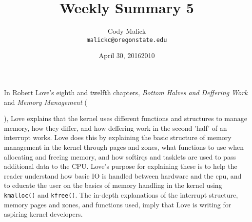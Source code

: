\documentclass[10pt,letterpaper]{article}
\begin{document}
  \title{Weekly Summary 5}
  \author{Cody Malick\\
  \texttt{malickc@oregonstate.edu}}
  \date{April 30, 2016}
  \maketitle

    In Robert Love's eighth and twelfth chapters, \textit{Bottom Halves and Deffering Work}
    and \textit{Memory Management} (\date{2010}), Love explains
    that the kernel uses different functions and structures to manage memory,
    how they differ, and how deffering work in the second 'half' of an interrupt works.
    Love does this by explaining the basic structure of memory management in the
    kernel through pages and zones, what functions to use when allocating and freeing
    memory, and how softirqs and tasklets are used to pass additional data to the
    CPU. Love's purpose for explaining these is to help the reader understand how
    basic IO is handled between hardware and the cpu, and to educate the user on
    the basics of memory handling in the kernel using \texttt{kmalloc()} and
    \texttt{kfree()}. The in-depth explanations of the interrupt structure,
    memory pages and zones, and functions used, imply that Love is writing for
    aspiring kernel developers.
\end{document}

